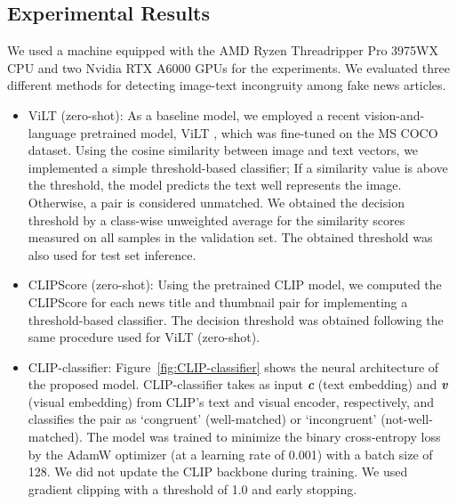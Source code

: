 \documentclass[11pt]{article}
\begin{document}
\subsection{Experimental Results}
We used a machine equipped with the AMD Ryzen Threadripper Pro 3975WX CPU and two Nvidia RTX A6000 GPUs for the experiments. We evaluated three different methods for detecting image-text incongruity among fake news articles.

\begin{itemize}
    \item ViLT (zero-shot): As a baseline model, we employed a recent vision-and-language pretrained model, ViLT \cite{kim2021vilt}, which was fine-tuned on the MS COCO dataset. Using the cosine similarity between image and text vectors, we implemented a simple threshold-based classifier; If a similarity value is above the threshold, the model predicts the text well represents the image. Otherwise, a pair is considered unmatched. We obtained the decision threshold by a class-wise unweighted average for the similarity scores measured on all samples in the validation set. The obtained threshold was also used for test set inference.

    \item CLIPScore (zero-shot): Using the pretrained CLIP model, we computed the CLIPScore for each news title and thumbnail pair for implementing a threshold-based classifier. The decision threshold was obtained following the same procedure used for ViLT (zero-shot).
 
    \item CLIP-classifier: Figure~\ref{fig:CLIP-classifier} shows the neural architecture of the proposed model. CLIP-classifier takes as input \textbf{\textit{c}} (text embedding) and \textbf{\textit{v}} (visual embedding) from CLIP's text and visual encoder, respectively, and classifies the pair as `congruent' (well-matched) or `incongruent' (not-well-matched). The model was trained to minimize the binary cross-entropy loss by the AdamW optimizer (at a learning rate of 0.001) with a batch size of 128. We did not update the CLIP backbone during training. We used gradient clipping with a threshold of 1.0 and early stopping.
\end{itemize}

\begin{table}[t]
\small
{}
\caption{Evaluation on the generated set.}
\label{tab:evaluation}
\end{table}
\end{document}
